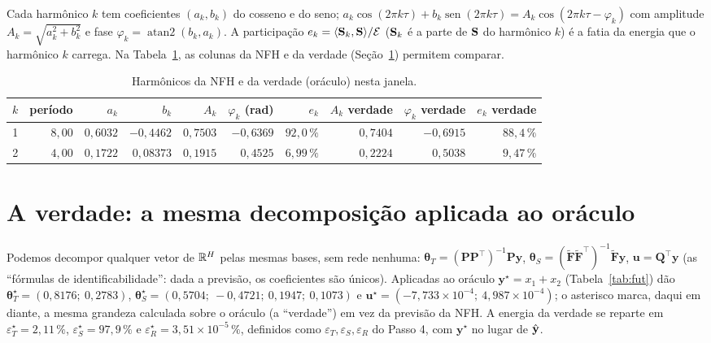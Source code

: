 \documentclass[11pt,a4paper]{article}
\newcommand{\bP}{\mathbf{P}}\newcommand{\bF}{\mathbf{F}}\newcommand{\bFt}{\widetilde{\mathbf{F}}}\newcommand{\bQ}{\mathbf{Q}}
\newcommand{\thT}{\boldsymbol{\theta}_T}\newcommand{\thS}{\boldsymbol{\theta}_S}\newcommand{\bu}{\mathbf{u}}
\DeclareMathOperator{\sen}{sen}
\begin{document}
Cada harmônico $k$ tem coeficientes $(a_k,b_k)$ do cosseno e do seno; $a_k\cos(2\pi k\tau)+b_k\sen(2\pi k\tau)=A_k\cos(2\pi k\tau-\varphi_k)$ com amplitude $A_k=\sqrt{a_k^2+b_k^2}$ e fase $\varphi_k=\operatorname{atan2}(b_k,a_k)$. A participação $e_k=\langle \mathbf{S}_k,\mathbf{S}\rangle/\mathcal{E}$ ($\mathbf{S}_k$ é a parte de $\mathbf{S}$ do harmônico $k$) é a fatia da energia que o harmônico $k$ carrega. Na Tabela~\ref{tab:harm}, as colunas da NFH e da verdade (Seção~\ref{sec:verdade}) permitem comparar.

\begin{table}[H]
\centering
\caption{Harmônicos da NFH e da verdade (oráculo) nesta janela.}\label{tab:harm}
\footnotesize
\begin{tabular}{rrrrrrrrrr}
\toprule
$k$ & período & $a_k$ & $b_k$ & $A_k$ & $\varphi_k$ (rad) & $e_k$ & $A_k$ verdade & $\varphi_k$ verdade & $e_k$ verdade \\
\midrule
1 & $8,00$ & $0,6032$ & $-0,4462$ & $0,7503$ & $-0,6369$ & $92,0\,\%$ & $0,7404$ & $-0,6915$ & $88,4\,\%$ \\
2 & $4,00$ & $0,1722$ & $0,08373$ & $0,1915$ & $0,4525$ & $6,99\,\%$ & $0,2224$ & $0,5038$ & $9,47\,\%$ \\
\bottomrule
\end{tabular}
\par\vspace{2pt}{\footnotesize Fonte: elaborado pelo autor.}
\end{table}

\section{A verdade: a mesma decomposição aplicada ao oráculo}\label{sec:verdade}

Podemos decompor qualquer vetor de $\mathbb{R}^H$ pelas mesmas bases, sem rede nenhuma: $\thT=(\bP\bP^\top)^{-1}\bP\mathbf y$, $\thS=(\bFt\bFt^\top)^{-1}\bFt\mathbf y$, $\bu=\bQ^\top\mathbf y$ (as ``fórmulas de identificabilidade'': dada a previsão, os coeficientes são únicos). Aplicadas ao oráculo $\mathbf y^\star=x_1+x_2$ (Tabela~\ref{tab:fut}) dão $\thT^\star=(0,8176;\allowbreak\ 0,2783)$, $\thS^\star=(0,5704;\allowbreak\ -0,4721;\allowbreak\ 0,1947;\allowbreak\ 0,1073)$ e $\bu^\star=(-7,733\times 10^{-4};\allowbreak\ 4,987\times 10^{-4})$; o asterisco marca, daqui em diante, a mesma grandeza calculada sobre o oráculo (a ``verdade'') em vez da previsão da NFH. A energia da verdade se reparte em $\varepsilon_T^\star=2,11\,\%$, $\varepsilon_S^\star=97,9\,\%$ e $\varepsilon_R^\star=3,51\times 10^{-5}\,\%$, definidos como $\varepsilon_T,\varepsilon_S,\varepsilon_R$ do Passo 4, com $\mathbf y^\star$ no lugar de $\hat{\mathbf{y}}$.
\end{document}
